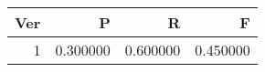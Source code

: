 \begin{tabular}{rrrr}
\toprule
Ver & P & R & F \\
\midrule
1 & 0.300000 & 0.600000 & 0.450000 \\
\bottomrule
\end{tabular}
